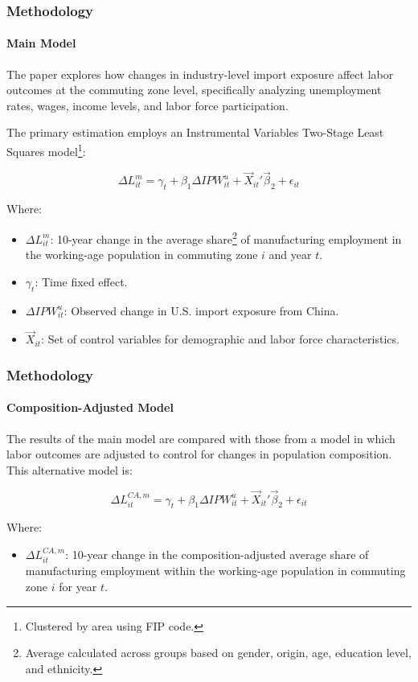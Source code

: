 \begin{frame}
    \frametitle{Methodology}
    \framesubtitle{Main Model}
    The paper explores how changes in industry-level import exposure affect labor outcomes at the commuting zone level, specifically analyzing unemployment rates, wages, income levels, and labor force participation.

    The primary estimation employs an Instrumental Variables Two-Stage Least Squares model\footnote{Clustered by area using FIP code.}:

    \begin{equation}
        \Delta L_{it}^{m} = \gamma_t + \beta_1 \Delta IPW_{it}^u + \Vec{X}_{it}'\Vec{\beta}_2 + \epsilon_{it}
        \label{eq:main_panel_regression}
    \end{equation}

    Where:

    \begin{itemize}
        \item $\Delta L_{it}^{m}$: 10-year change in the average share\footnote{Average calculated across groups based on gender, origin, age, education level, and ethnicity.} of manufacturing employment in the working-age population in commuting zone $i$ and year $t$.
        \item $\gamma_t$: Time fixed effect.
        \item $\Delta IPW_{it}^u$: Observed change in U.S. import exposure from China.
        \item $\Vec{X}_{it}$: Set of control variables for demographic and labor force characteristics.
    \end{itemize}
\end{frame}

\begin{frame}
    \frametitle{Methodology}
    \framesubtitle{Composition-Adjusted Model}
    The results of the main model are compared with those from a model in which labor outcomes are adjusted to control for changes in population composition. This alternative model is:

    \begin{equation}
        \Delta L_{it}^{CA, m} = \gamma_t + \beta_1 \Delta IPW_{it}^u + \Vec{X}_{it}'\Vec{\beta}_2 + \epsilon_{it}
        \label{eq:alternative_panel_regression}
    \end{equation}

    Where:

    \begin{itemize}
        \item $\Delta L_{it}^{CA, m}$: 10-year change in the composition-adjusted average share of manufacturing employment within the working-age population in commuting zone $i$ for year $t$.
    \end{itemize}
\end{frame}


